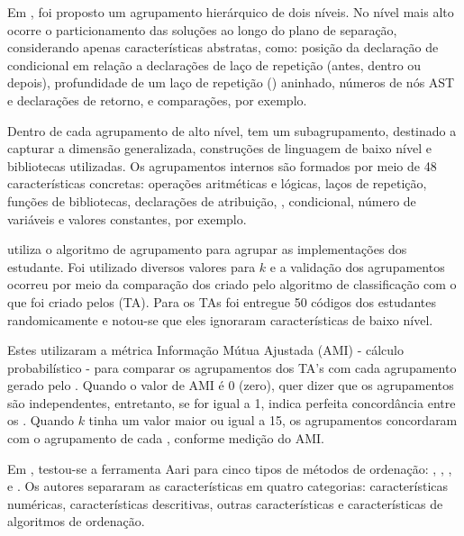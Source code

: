 	    
	    Em , foi proposto um agrupamento hierárquico de dois
	    níveis. No nível mais alto ocorre o particionamento das soluções ao longo do
	    plano de separação, considerando apenas características abstratas, como:
	    posição da declaração de condicional em relação a declarações de laço de
	    repetição (antes, dentro ou depois), profundidade de um laço de repetição
	    () aninhado, números de nós AST e declarações de retorno,
	     e comparações, por exemplo.
	    
	    Dentro de cada agrupamento de alto nível, tem um subagrupamento, destinado a
	    capturar a dimensão generalizada, construções de linguagem de baixo nível e
	    bibliotecas utilizadas. Os agrupamentos internos são formados por meio de 48
	    características concretas: operações aritméticas e lógicas, laços de repetição,
	    funções de bibliotecas, declarações de atribuição, , condicional,
	    número de variáveis e valores constantes, por exemplo.
	    
	     utiliza o algoritmo de agrupamento  para agrupar
	    as implementações dos estudante. Foi utilizado diversos valores para $k$
	    e a validação dos agrupamentos ocorreu por meio da comparação dos 
	    criado pelo algoritmo de classificação com o que foi criado pelos
	     (TA). Para os TAs foi entregue 50 códigos
	    dos estudantes randomicamente e notou-se que eles ignoraram características
	    de baixo nível.
	    
	    Estes utilizaram a métrica Informação Mútua Ajustada (AMI) - cálculo
	    probabilístico - para comparar os agrupamentos dos TA's com cada agrupamento
	    gerado pelo . Quando o valor de AMI é 0 (zero), quer dizer
	    que os agrupamentos são independentes, entretanto, se for igual a 1, indica
	    perfeita concordância entre os . Quando $k$ tinha um
	    valor maior ou igual a 15, os agrupamentos concordaram com
	    o agrupamento de cada , conforme medição do AMI.
	    
	    Em , testou-se a ferramenta Aari para cinco tipos
	    de métodos de ordenação: , ,
	    ,  e . Os autores
		separaram as características em quatro categorias: características numéricas,
		características descritivas, outras características e características de
		algoritmos de ordenação.
	    
